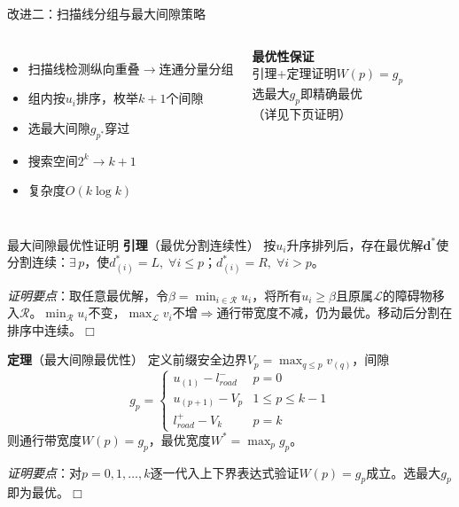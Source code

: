 \documentclass[aspectratio=169,10pt,fontset=none]{ctexbeamer}
\begin{document}
\begin{frame}{改进二：扫描线分组与最大间隙策略}
\begin{columns}[T,onlytextwidth]
  \centering
  \small
  \begin{itemize}\setlength\itemsep{3pt}
    \item 扫描线检测纵向重叠$\to$连通分量分组
    \item 组内按$u_i$排序，枚举$k{+}1$个间隙
    \item 选最大间隙$g_{p^*}$穿过
    \item 搜索空间$2^k\to k{+}1$
    \item 复杂度$O(k\log k)$
  \end{itemize}
  \vspace{0.4em}
  \textbf{最优性保证}\\
  引理+定理证明$W(p)=g_p$\\
  选最大$g_p$即精确最优\\
  （详见下页证明）
\end{columns}
\end{frame}

\begin{frame}{最大间隙最优性证明}
\small
\textbf{引理}（最优分割连续性）\quad
按$u_i$升序排列后，存在最优解$\mathbf{d}^*$使分割连续：$\exists\, p$，使$d_{(i)}^*=L,\;\forall i\leq p$；$d_{(i)}^*=R,\;\forall i>p$。

\vspace{0.3em}
\textit{证明要点}：取任意最优解，令$\beta=\min_{i\in\mathcal{R}}u_i$，将所有$u_i\geq\beta$且原属$\mathcal{L}$的障碍物移入$\mathcal{R}$。$\min_{\mathcal{R}}u_i$不变，$\max_{\mathcal{L}}v_i$不增$\Rightarrow$通行带宽度不减，仍为最优。移动后分割在排序中连续。$\Box$

\vspace{0.5em}
\textbf{定理}（最大间隙最优性）\quad
定义前缀安全边界$V_p=\max_{q\leq p}v_{(q)}$，间隙
\[
g_p = \begin{cases}
  u_{(1)}-l_{road}^- & p=0\\
  u_{(p+1)}-V_p & 1\leq p\leq k{-}1\\
  l_{road}^+-V_k & p=k
\end{cases}
\]
则通行带宽度$W(p)=g_p$，最优宽度$W^*=\max_p g_p$。

\vspace{0.3em}
\textit{证明要点}：对$p=0,1,\ldots,k$逐一代入上下界表达式验证$W(p)=g_p$成立。选最大$g_p$即为最优。$\Box$
\end{frame}
\end{document}
